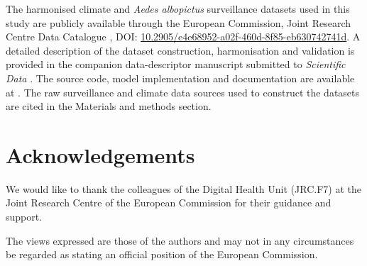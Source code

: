 \documentclass[preprint,12pt]{elsarticle}
\begin{document}
The harmonised climate and \textit{Aedes albopictus} surveillance datasets
used in this study are publicly available through the European Commission,
Joint Research Centre Data Catalogue \cite{biazzo2026_datasets_doi}, DOI:
\href{https://doi.org/10.2905/e4e68952-a02f-460d-8f85-eb630742741d}
{10.2905/e4e68952-a02f-460d-8f85-eb630742741d}.
A detailed description of the dataset construction, harmonisation and
validation is provided in the companion data-descriptor manuscript submitted
to \textit{Scientific Data} \cite{biazzo2026_datasets}.
The source code, model implementation and documentation are available at
\cite{github2024aiedes}. The raw surveillance and climate data sources
used to construct the datasets are cited in the Materials and methods section.



\section*{Acknowledgements}
We would like to thank the colleagues of the Digital Health Unit (JRC.F7) at the Joint Research Centre of the European Commission for their guidance and support. 

The views expressed are those of the authors and may not in any circumstances be regarded as stating an official position of the European Commission. 



\end{document}
